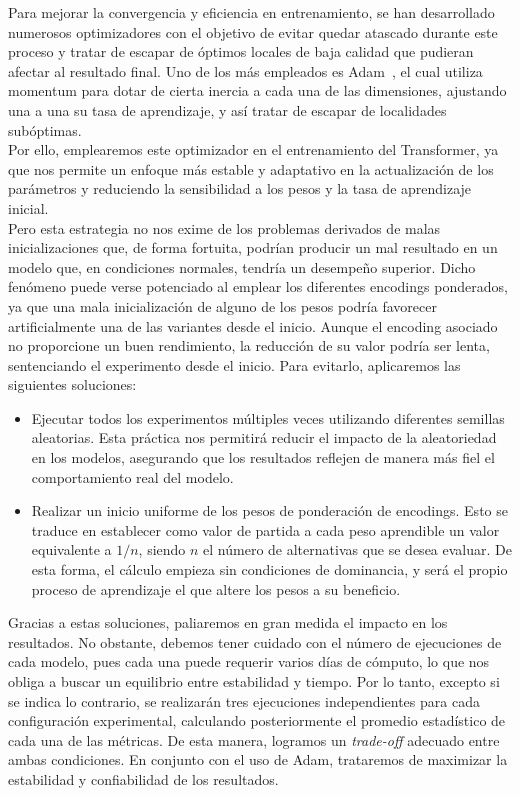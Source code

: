 Para mejorar la convergencia y eficiencia en entrenamiento, se han desarrollado numerosos optimizadores con el objetivo de evitar quedar atascado durante este proceso y tratar de escapar de óptimos locales de baja calidad que pudieran afectar al resultado final. Uno de los más empleados es Adam~\cite{kingma2017adammethodstochasticoptimization}, el cual utiliza momentum para dotar de cierta inercia a cada una de las dimensiones, ajustando una a una su tasa de aprendizaje, y así tratar de escapar de localidades subóptimas.\\

Por ello, emplearemos este optimizador en el entrenamiento del Transformer, ya que nos permite un enfoque más estable y adaptativo en la actualización de los parámetros y reduciendo la sensibilidad a los pesos y la tasa de aprendizaje inicial.\\

Pero esta estrategia no nos exime de los problemas derivados de malas inicializaciones que, de forma fortuita, podrían producir un mal resultado en un modelo que, en condiciones normales, tendría un desempeño superior. Dicho fenómeno puede verse potenciado al emplear los diferentes encodings ponderados, ya que una mala inicialización de alguno de los pesos podría favorecer artificialmente una de las variantes desde el inicio. Aunque el encoding asociado no proporcione un buen rendimiento, la reducción de su valor podría ser lenta, sentenciando el experimento desde el inicio. Para evitarlo, aplicaremos las siguientes soluciones:

\begin{itemize}
	\item Ejecutar todos los experimentos múltiples veces utilizando diferentes semillas aleatorias. Esta práctica nos permitirá reducir el impacto de la aleatoriedad en los modelos, asegurando que los resultados reflejen de manera más fiel el comportamiento real del modelo.
	\item Realizar un inicio uniforme de los pesos de ponderación de encodings. Esto se traduce en establecer como valor de partida a cada peso aprendible un valor equivalente a $1/n$, siendo $n$ el número de alternativas que se desea evaluar. De esta forma, el cálculo empieza sin condiciones de dominancia, y será el propio proceso de aprendizaje el que altere los pesos a su beneficio.
\end{itemize}

Gracias a estas soluciones, paliaremos en gran medida el impacto en los resultados. No obstante, debemos tener cuidado con el número de ejecuciones de cada modelo, pues cada una puede requerir varios días de cómputo, lo que nos obliga a buscar un equilibrio entre estabilidad y tiempo. Por lo tanto, excepto si se indica lo contrario, se realizarán tres ejecuciones independientes para cada configuración experimental, calculando posteriormente el promedio estadístico de cada una de las métricas. De esta manera, logramos un \textit{trade-off} adecuado entre ambas condiciones. En conjunto con el uso de Adam, trataremos de maximizar la estabilidad y confiabilidad de los resultados.

